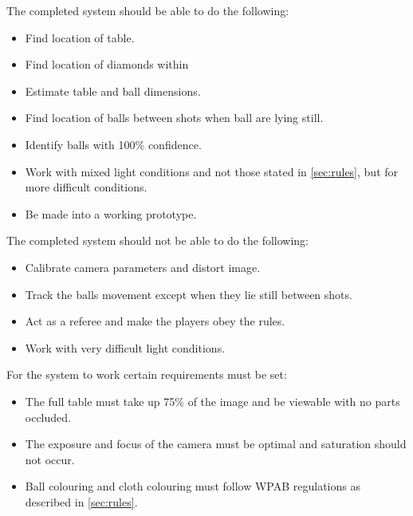 The completed system should be able to do the following:

\begin{itemize}
\setlength{\itemsep}{0mm}
	\item Find location of table.
	\item Find location of diamonds within  
	\item Estimate table and ball dimensions.
	\item Find location of balls between shots when ball are lying still.
	\item Identify balls with 100\% confidence. %
	\item Work with mixed light conditions and not those stated in \ref{sec:rules}, but for more difficult conditions.
	\item Be made into a working prototype.
\end{itemize}

The completed system should not be able to do the following:

\begin{itemize}
\setlength{\itemsep}{0mm}
	\item Calibrate camera parameters and distort image.
	\item Track the balls movement except when they lie still between shots.
	\item Act as a referee and make the players obey the rules.
	\item Work with very difficult light conditions.
\end{itemize}
For the system to work certain requirements must be set:

\begin{itemize}
\setlength{\itemsep}{0mm}
	\item The full table must take up 75\% of the image and  be viewable with no parts occluded.
	\item The exposure and focus of the camera must be optimal and saturation should not occur.
	\item Ball colouring and cloth colouring must follow WPAB regulations as described in \ref{sec:rules}.
\end{itemize}